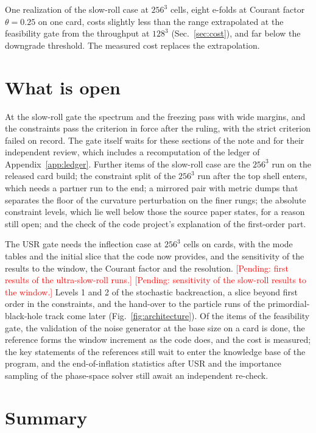 \documentclass[aps,prd,twocolumn,10pt,superscriptaddress,nofootinbib,longbibliography,floatfix]{revtex4-2}
\newcommand{\pending}[1]{\textcolor{red}{[Pending: #1]}}
\begin{document}
One realization of the slow-roll case at $256^3$ cells, eight e-folds at Courant factor $\theta=0.25$ on one card, costs slightly less than the range extrapolated at the feasibility gate from the throughput at $128^3$ (Sec.~\ref{sec:cost}), and far below the downgrade threshold. The measured cost replaces the extrapolation.

\section{What is open}\label{sec:open}

At the slow-roll gate the spectrum and the freezing pass with wide margins, and the constraints pass the criterion in force after the ruling, with the strict criterion failed on record. The gate itself waits for these sections of the note and for their independent review, which includes a recomputation of the ledger of Appendix~\ref{app:ledger}. Further items of the slow-roll case are the $256^3$ run on the released card build; the constraint split of the $256^3$ run after the top shell enters, which needs a partner run to the end; a mirrored pair with metric dumps that separates the floor of the curvature perturbation on the finer rungs; the absolute constraint levels, which lie well below those the source paper states, for a reason still open; and the check of the code project's explanation of the first-order part.

The USR gate needs the inflection case at $256^3$ cells on cards, with the mode tables and the initial slice that the code now provides, and the sensitivity of the results to the window, the Courant factor and the resolution. \pending{first results of the ultra-slow-roll runs.} \pending{sensitivity of the slow-roll results to the window.} Levels 1 and 2 of the stochastic backreaction, a slice beyond first order in the constraints, and the hand-over to the particle runs of the primordial-black-hole track come later (Fig.~\ref{fig:architecture}). Of the items of the feasibility gate, the validation of the noise generator at the base size on a card is done, the reference forms the window increment as the code does, and the cost is measured; the key statements of the references still wait to enter the knowledge base of the program, and the end-of-inflation statistics after USR and the importance sampling of the phase-space solver still await an independent re-check.

\section{Summary}\label{sec:summary}
\end{document}
